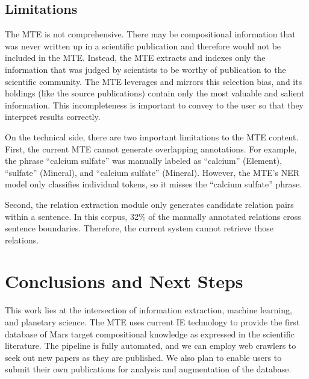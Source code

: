 \documentclass[letterpaper]{article} %
\begin{document}
\subsection{Limitations}

The MTE is not comprehensive.  There may be compositional information
that was never written up in a scientific publication and therefore
would not be included in the MTE.  Instead, the MTE extracts and
indexes only the information that was judged by scientists to be
worthy of publication to the scientific community.  The MTE leverages
and mirrors this selection bias, and its holdings (like the source
publications) contain only the most valuable and salient information.
This incompleteness is important to convey to the user so that
they interpret results correctly.

On the technical side, there are two important limitations to the MTE
content.  First, the current MTE cannot generate overlapping
annotations.  For example, the phrase ``calcium sulfate'' was manually
labeled as ``calcium'' (Element), ``sulfate'' (Mineral), and
``calcium sulfate'' (Mineral).  However, the MTE's NER model only
classifies individual tokens, so it misses the ``calcium sulfate''
phrase. 

Second, the relation extraction module only generates candidate
relation pairs within a sentence.  In this corpus, 32\% of the
manually annotated relations cross sentence boundaries.  Therefore,
the current system cannot retrieve those relations.



\section{Conclusions and Next Steps}

This work lies at the intersection of information extraction, machine
learning, and planetary science.  The MTE uses current IE technology
to provide the first database of Mars target compositional knowledge
as expressed in the scientific literature.  The pipeline is fully
automated, and we can employ web crawlers to seek out new papers as
they are published.  We also plan to enable users to submit their own
publications for analysis and augmentation of the database.
\end{document}
